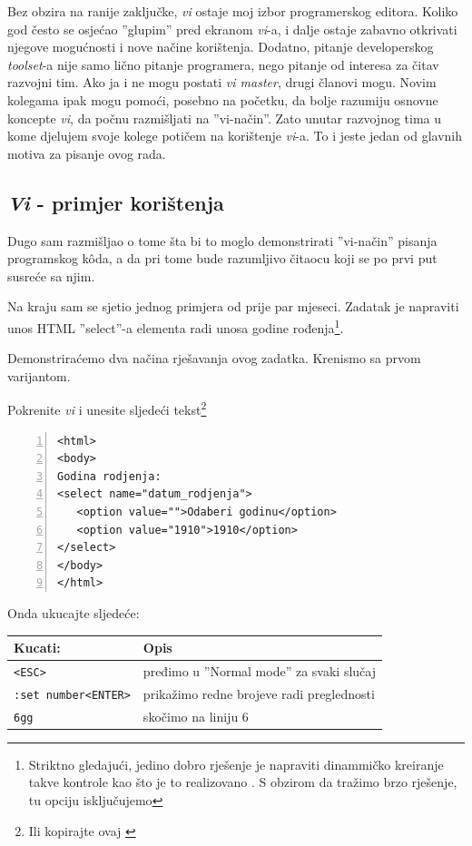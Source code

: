 \documentclass[times, utf8, seminar]{fit}
\begin{document}
Bez obzira na ranije zaključke, \emph{vi} ostaje moj izbor programerskog editora.  Koliko god često se osjećao ''glupim'' pred ekranom \emph{vi}-a, i dalje ostaje zabavno otkrivati njegove mogućnosti i nove načine korištenja. Dodatno, pitanje developerskog \emph{toolset}-a nije samo lično pitanje programera, nego pitanje od interesa za čitav razvojni tim. 
Ako ja i ne mogu postati \emph{vi master}, drugi članovi mogu. Novim kolegama ipak mogu pomoći, posebno na početku, da bolje razumiju osnovne koncepte \emph{vi}, da počnu razmišljati na ''vi-način''. Zato unutar razvojnog tima u kome djelujem svoje kolege potičem na korištenje \emph{vi}-a. To i jeste jedan od glavnih motiva za pisanje ovog rada.

\subsection{\emph{Vi} - primjer korištenja}

Dugo sam razmišljao o tome šta bi to moglo demonstrirati ''vi-način'' pisanja programskog k\^oda, a da pri tome bude razumljivo čitaocu koji se po prvi put susreće sa njim.

Na kraju sam se sjetio jednog primjera od prije par mjeseci. Zadatak je napraviti unos HTML ''select''-a elementa radi unosa godine rođenja\footnote{Striktno gledajući, jedino dobro rješenje je napraviti dinammičko kreiranje takve kontrole kao što je to realizovano \href{https://github.com/hernad/FIT\_WT/blob/master/09\_2012/util.js\#L9}{\color{blue}{ovdje}}. S obzirom da tražimo brzo rješenje, tu opciju isključujemo}.

Demonstriraćemo dva načina rješavanja ovog zadatka. Krenismo sa prvom varijantom.

Pokrenite \emph{vi} i unesite sljedeći tekst\footnote{Ili kopirajte ovaj \href{https://gist.github.com/raw/4412263/1e751a7305ab75823689cfb7654304337f75336e/gistfile1.txt}{\color{blue}{gist}}}
\begin{lstlisting}[numbers=left]
<html>
<body>
Godina rodjenja:
<select name="datum_rodjenja">
   <option value="">Odaberi godinu</option>
   <option value="1910">1910</option>
</select>
</body>
</html>
\end{lstlisting}

Onda ukucajte sljedeće:

\begin{center}
\begin{tabular}{ l | l }
  \hline                        
   Kucati:    &  Opis \\ 
   \hline
   \verb+<ESC>+     & pređimo u ''Normal mode'' za svaki slučaj \\
   \verb+:set number<ENTER>+ &  prikažimo redne brojeve radi preglednosti \\
   \verb+6gg+    & skočimo na liniju 6 \\
   \hline
\end{tabular}
\end{center}
\end{document}
